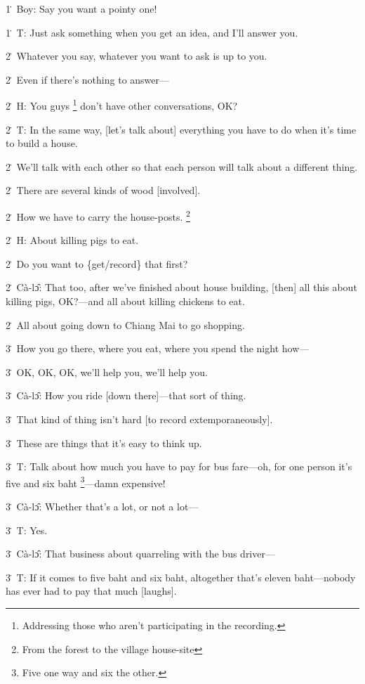 1\. Boy: Say you want a pointy one!

1\. T: Just ask something when you get an idea, and I'll answer you.

2\. Whatever you say, whatever you want to ask is up to you.

2\. Even if there's nothing to answer---

2\. H: You guys \footnote{Addressing those who aren't participating in the recording.} don't have other conversations, OK?

2\. T: In the same way, [let's talk about] everything you have to do when it's
time to build a house.

2\. We'll talk with each other so that each person will talk about a different
thing.

2\. There are several kinds of wood [involved].

2\. How we have to carry the house-posts. \footnote{From the forest to the village house-site}

2\. H: About killing pigs to eat.

2\. Do you want to \{get/record\} that first?

2\. Cà-lɔ̂: That too, after we've finished about house building, [then] all
this about killing pigs, OK?---and all about killing chickens to eat.

2\. All about going down to Chiang Mai to go shopping.

3\. How you go there, where you eat, where you spend the night how---

3\. OK, OK, OK, we'll help you, we'll help you.

3\. Cà-lɔ̂: How you ride [down there]---that sort of thing.

3\. That kind of thing isn't hard [to record extemporaneously].

3\. These are things that it's easy to think up.

3\. T: Talk about how much you have to pay for bus fare---oh, for one person it's
five and six baht \footnote{Five one way and six the other.}---damn expensive!

3\. Cà-lɔ̂: Whether that's a lot, or not a lot---

3\. T: Yes.

3\. Cà-lɔ̂: That business about quarreling with the bus driver---

3\. T: If it comes to five baht and six baht, altogether that's eleven baht---nobody
has ever had to pay that much [laughs].

